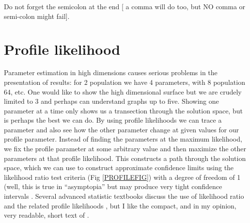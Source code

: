 Do not forget the semicolon at the end [ a comma will do too, but NO comma or semi-colon might fail].
\newpage
\section{Profile likelihood}
Parameter estimation in high dimensions causes serious problems 
in the presentation of results: for 2 population we have 4 parameters,
with 8 population 64, etc. One would like to show the high dimensional surface
but we are crudely limited to 3 and perhaps can understand graphs up to five.
Showing one parameter at a time only shows us a transection through the solution space, but is perhaps the best we can do. By using profile likelihoods
we can trace a parameter and also see how the other parameter change at given 
values for our profile parameter. Instead of finding the parameters at the maximum likelihood, we fix the profile parameter at some arbitrary value and then maximize the other parameters at that profile likelihood. This constructs a path through the solution space, which we can use to construct approximate confidence limits
using the likelihood ratio test criteria (Fig \ref{PROFILEFIG}) with a degree of freedom of 1 (well, this is true in ``asymptopia'' 
but may produce very tight confidence intervals \cite{beerli:2001:mle}. Several advanced statistic textbooks discuss the use of likelihood ratio and
the related profile likelihoods \cite[e.g. ][]{casella:1996}, but I like the compact,
and in my opinion, very readable, short text of \cite{meeker:1995:taa}. 
 
